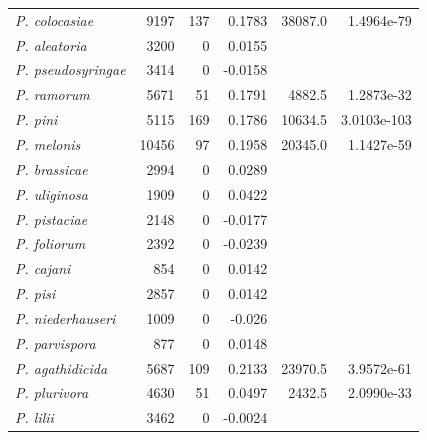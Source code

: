 \begin{longtable}{@{}lrrrrr@{}}
  \textit{P. colocasiae}              & 9197       & 137        & 0.1783       & 38087.0      & 1.4964e-79  \\
  \textit{P. aleatoria}               & 3200       & 0          & 0.0155       &              &                         \\
  \textit{P. pseudosyringae}          & 3414       & 0          & -0.0158      &              &                         \\
  \textit{P. ramorum}                 & 5671       & 51         & 0.1791       & 4882.5       & 1.2873e-32  \\
  \textit{P. pini}                    & 5115       & 169        & 0.1786       & 10634.5      & 3.0103e-103   \\
  \textit{P. melonis}                 & 10456      & 97         & 0.1958       & 20345.0      & 1.1427e-59  \\
  \textit{P. brassicae}               & 2994       & 0          & 0.0289       &              &             \\
  \textit{P. uliginosa}               & 1909       & 0          & 0.0422       &              &             \\
  \textit{P. pistaciae}               & 2148       & 0          & -0.0177      &              &             \\
  \textit{P. foliorum}                & 2392       & 0          & -0.0239      &              &             \\
  \textit{P. cajani}                  & 854        & 0          & 0.0142       &              &             \\
  \textit{P. pisi}                    & 2857       & 0          & 0.0142       &              &             \\
  \textit{P. niederhauseri}           & 1009       & 0          & -0.026       &              &             \\
  \textit{P. parvispora}              & 877        & 0          & 0.0148       &              &             \\
  \textit{P. agathidicida}            & 5687       & 109        & 0.2133       & 23970.5      & 3.9572e-61  \\
  \textit{P. plurivora}               & 4630       & 51         & 0.0497       & 2432.5       & 2.0990e-33   \\
  \textit{P. lilii}                   & 3462       & 0          & -0.0024      &              &                         \\

\end{longtable}
